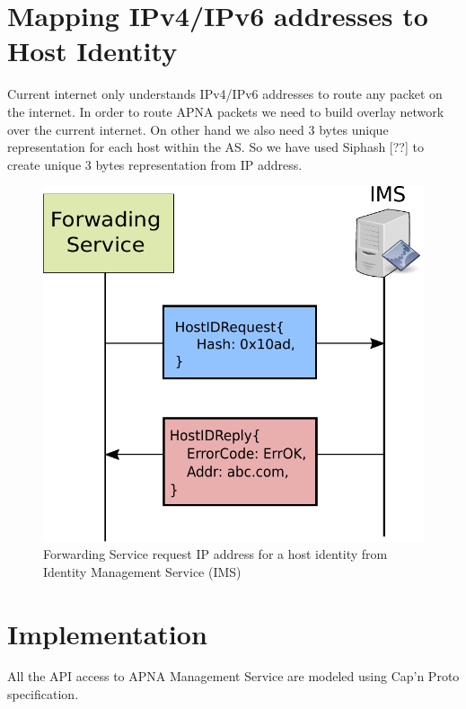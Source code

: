 \section{Mapping IPv4/IPv6 addresses to Host Identity} \label{ims}
Current internet only understands IPv4/IPv6 addresses to route any packet on the internet. In order to route APNA packets we need to build overlay network over the current internet. On other hand we also need 3 bytes unique representation for each host within the AS. So we have used Siphash [??] to create unique 3 bytes representation from IP address.

\begin{figure}[th!]
\centering
\includegraphics[scale=0.6]{Figures/siphash.pdf}
\decoRule
\caption[Host Identity Service]{Forwarding Service request IP address for a host identity from Identity Management Service (IMS)}
\label{fig:ims_request}
\end{figure}

\section{Implementation}
All the API access to APNA Management Service are modeled using Cap’n Proto specification.